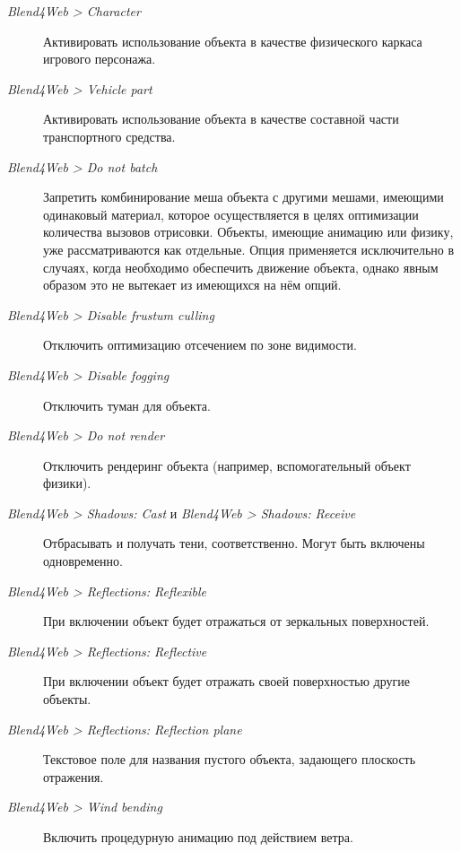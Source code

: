 \documentclass[a4paper,12pt,oneside]{sphinxmanual}
\begin{document}
\begin{description}
\item[{\emph{Blend4Web \textgreater{} Character}}] \leavevmode
Активировать использование объекта в качестве физического каркаса игрового персонажа.

\item[{\emph{Blend4Web \textgreater{} Vehicle part}}] \leavevmode
Активировать использование объекта в качестве составной части транспортного средства.

\item[{\emph{Blend4Web \textgreater{} Do not batch}}] \leavevmode
Запретить комбинирование меша объекта с другими мешами, имеющими одинаковый материал, которое осуществляется в целях оптимизации количества вызовов отрисовки. Объекты, имеющие анимацию или физику, уже рассматриваются как отдельные. Опция применяется исключительно в случаях, когда необходимо обеспечить движение объекта, однако явным образом это не вытекает из имеющихся на нём опций.

\item[{\emph{Blend4Web \textgreater{} Disable frustum culling}}] \leavevmode
Отключить оптимизацию отсечением по зоне видимости.

\item[{\emph{Blend4Web \textgreater{} Disable fogging}}] \leavevmode
Отключить туман для объекта.

\item[{\emph{Blend4Web \textgreater{} Do not render}}] \leavevmode
Отключить рендеринг объекта (например, вспомогательный объект физики).

\item[{\emph{Blend4Web \textgreater{} Shadows: Cast} и \emph{Blend4Web \textgreater{} Shadows: Receive}}] \leavevmode
Отбрасывать и получать тени, соответственно. Могут быть включены одновременно.

\item[{\emph{Blend4Web \textgreater{} Reflections: Reflexible}}] \leavevmode
При включении объект будет отражаться от зеркальных поверхностей.

\item[{\emph{Blend4Web \textgreater{} Reflections: Reflective}}] \leavevmode
При включении объект будет отражать своей поверхностью другие объекты.

\item[{\emph{Blend4Web \textgreater{} Reflections: Reflection plane}}] \leavevmode
Текстовое поле для названия пустого объекта, задающего плоскость отражения.

\item[{\emph{Blend4Web \textgreater{} Wind bending}}] \leavevmode
Включить процедурную анимацию под действием ветра.


\end{description}
\end{document}
